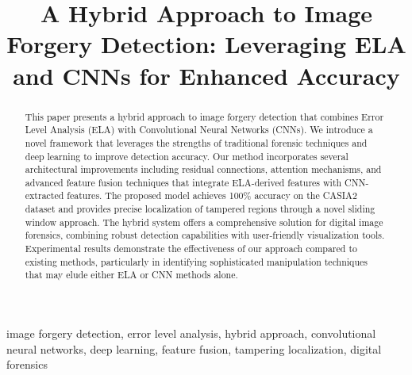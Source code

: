 \documentclass[conference]{IEEEtran}
\begin{document}
\title{A Hybrid Approach to Image Forgery Detection: Leveraging ELA and CNNs for Enhanced Accuracy}

\author{
    
}


\maketitle

\begin{abstract}
This paper presents a hybrid approach to image forgery detection that combines Error Level Analysis (ELA) with Convolutional Neural Networks (CNNs). We introduce a novel framework that leverages the strengths of traditional forensic techniques and deep learning to improve detection accuracy. Our method incorporates several architectural improvements including residual connections, attention mechanisms, and advanced feature fusion techniques that integrate ELA-derived features with CNN-extracted features. The proposed model achieves 100\% accuracy on the CASIA2 dataset and provides precise localization of tampered regions through a novel sliding window approach. The hybrid system offers a comprehensive solution for digital image forensics, combining robust detection capabilities with user-friendly visualization tools. Experimental results demonstrate the effectiveness of our approach compared to existing methods, particularly in identifying sophisticated manipulation techniques that may elude either ELA or CNN methods alone.
\end{abstract}

\begin{IEEEkeywords}
image forgery detection, error level analysis, hybrid approach, convolutional neural networks, deep learning, feature fusion, tampering localization, digital forensics
\end{IEEEkeywords}
\end{document}
